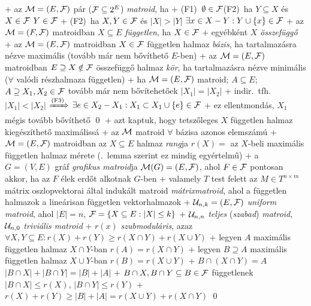 + \dfn az $\mathcal{M} = (E, \mathcal{F})$ pár ($\mathcal{F} \subseteq 2^E$) \emph{matroid},
  ha
  + (F1)~$\emptyset \in \mathcal{F}$\qquad(F2)~ha $Y \subseteq X$ és $X \in
    \mathcal{F}$ \RA $Y \in \mathcal{F}$
  + (F2)~ha $X, Y \in \mathcal{F}$ és $\lvert X \rvert > \lvert Y \rvert$ \RA
    $\exists x \in X - Y : Y \cup \{ x \} \in \mathcal{F}$
+ \dfn az $\mathcal{M} = (F, \mathcal{F})$ matroidban $X \subseteq E$
  \emph{független}, ha $X \in \mathcal{F}$
  + egyébként $X$ \emph{összefüggő}
+ \dfn az $\mathcal{M} = (E, \mathcal{F})$ matroidban $X \in \mathcal{F}$ független
  halmaz \emph{bázis}, ha tartalmazásra nézve maximális (tovább már
  nem bővíthető $E$-ben)
+ \dfn az $\mathcal{M} = (E, \mathcal{F})$ matroidban $E \supseteq X \notin \mathcal{F}$
  összefüggő halmaz \emph{kör}, ha tartalmazásra nézve minimális
  ($\forall$ valódi részhalmaza független)
+ \lemma \label{lem:matroid:def:meret}ha $\mathcal{M} = (E, \mathcal{F})$ matroid; $A
  \subseteq E$; $A \supseteq X_1, X_2 \in \mathcal{F}$ tovább már nem
  bővítehetőek \RA $\lvert X_1 \rvert = \lvert X_2 \rvert$
  + \proof indir.~tfh.~$\lvert X_1 \rvert < \lvert X_2 \rvert$
    $\xRightarrow{\text{(F3)}}$ $\exists e \in X_2 - X_1 : X_1
    \subset X_1 \cup \{ e \} \in \mathcal{F}$
  + ez ellentmondás, $X_1$ mégis tovább bővíthető \qed
  + azt kaptuk, hogy tetszőleges $X$ független halmaz kiegészíthető
    maximálissá
+ \corr az $\mathcal{M}$ matroid $\forall$ bázisa azonos elemszámú
+ \dfn $\mathcal{M} = (E, \mathcal{F})$ matroidban az $X \subseteq E$ halmaz
  \emph{rang}ja $r(X) =$ az $X$-beli maximális független halmaz mérete
  (.~lemma szerint ez mindig egyértelmű)
+ \example  a $G = (V, E)$ gráf \emph{grafikus matroid}ja $\mathcal{M}(G) =
  (E, \mathcal{F})$, ahol $F \in \mathcal{F}$ pontosan akkor, ha az $F$ élek erdőt
  alkotnak $G$-ben
+ \example valamely $T$ test felett az $M \in T^{n \times m}$ mátrix
  oszlopvektorai által indukált matroid \emph{mátrixmatroid}, ahol
  a független halmazok a lineárisan független vektorhalmazok
+ $\mathcal{U}_{n, k} = (E, \mathcal{F})$ \emph{uniform matroid}, ahol $\lvert E
  \rvert = n$, $\mathcal{F} = \{ X \subseteq E : \lvert X \rvert \le k \}$
  + $\mathcal{U}_{n, n}$ \emph{teljes} (\emph{szabad}) \emph{matroid},
    $\mathcal{U}_{n, 0}$ \emph{triviális matroid}
+ \thm \label{thm:matroid:def:submod}$r(x)$ \emph{szubmoduláris}, azaz
  $\forall X, Y \subseteq E: r(X) + r(Y) \ge r(X \cap Y) + r(X \cup Y)$
  + \proof legyen $A$ maximális független halmaz $X \cap Y$-ban
    \RA $r(A) = r(X \cap Y)$
  + legyen $B \supseteq A$ maximális független halmaz $X \cup Y$-ban
    \RA $r(B) = r(X \cup Y)$
  + $B \cap (X \cap Y) = A$ \RA $\lvert B \cap X \rvert + \lvert B
    \cap Y \rvert = \lvert B \rvert + \lvert A \rvert$
  + $B \cap X, B \cap Y \subseteq B \in \mathcal{F}$ függetlenek \RA%
    $\lvert B \cap X \rvert \le r(X)$, $\lvert B \cap Y \rvert \le
    r(Y)$
  + $r(X) + r(Y) \ge \lvert B \rvert + \lvert A \rvert = r(X \cup Y) +
    r(X \cap Y)$ \qed

